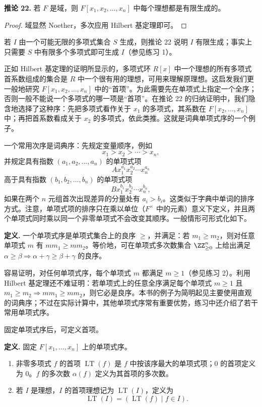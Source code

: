 \noindent\textbf{推论 22.} 若 $F$ 是域，则 $F[x_1,x_2,\ldots,x_n]$ 中每个理想都是有限生成的。

\begin{proof}
	域显然 Noether，多次应用 Hilbert 基定理即可。
\end{proof}

若 $I$ 由一个可能无限的多项式集合 $S$ 生成，则推论 22 说明 $I$ 有限生成；事实上只需要 $S$ 中有限多个多项式即可生成 $I$（参见练习 1）。

正如 Hilbert 基定理的证明所显示的，多项式环 $R[x]$ 中一个理想的所有多项式首系数组成的集合是 $R$ 中一个很有用的理想，可用来理解原理想。这启发我们更一般地研究 $F[x_1,x_2,\ldots,x_n]$ 中的“首项”。为此需要先在单项式上指定一个全序；否则一般不能说一个多项式的哪一项是“首项”。在推论 22 的归纳证明中，我们隐含地选择了这种序：先把多项式看作关于 $x_1$ 的多项式，其系数在 $F[x_2,\ldots,x_n]$ 中；再把首系数看成关于 $x_2$ 的多项式，依此类推。这就是词典单项式序的一个例子。

一个常用次序是词典序：先规定变量顺序，例如
\[
x_1>x_2>\cdots>x_n,
\]
并规定具有指数 $(a_1,a_2,\ldots,a_n)$ 的单项式项
\[
A x_1^{a_1}x_2^{a_2}\cdots x_n^{a_n}
\]
高于具有指数 $(b_1,b_2,\ldots,b_n)$ 的单项式项
\[
B x_1^{b_1}x_2^{b_2}\cdots x_n^{b_n},
\]
如果在两个 $n$ 元组首次出现差异的分量处有 $a_i>b_i$。这类似于字典中单词的排序方式。注意，单项式项的排序只在乘以单位（$F^\times$ 中的元素）意义下定义，并且两个单项式同时乘以同一个非零单项式不会改变其顺序。一般情形可形式化如下。

\noindent\textbf{定义.} 一个单项式序是单项式集合上的良序 $\geq$，并满足：若 $m_1\geq m_2$，则对任意单项式 $m$ 有 $mm_1\geq mm_2$。等价地，可在单项式多次数集合 $\ZZ_{\geq0}^n$ 上给出满足 $\alpha\geq\beta\Rightarrow \alpha+\gamma\geq\beta+\gamma$ 的良序。

容易证明，对任何单项式序，每个单项式 $m$ 都满足 $m\geq1$（参见练习 2）。利用 Hilbert 基定理还不难证明：若单项式上的任意全序满足每个单项式 $m\geq1$ 且 $m_1\geq m_2\Rightarrow mm_1\geq mm_2$，则它必是良序。本书的例子为简明起见主要使用直观的词典序；不过在实际计算中，其他单项式序常有重要优势，练习中还介绍了若干常用单项式序。

固定单项式序后，可定义首项。

\noindent\textbf{定义.} 固定 $F[x_1,\ldots,x_n]$ 上的单项式序。
\begin{enumerate}[label=(\arabic*)]
	\item 非零多项式 $f$ 的首项 $\operatorname{LT}(f)$ 是 $f$ 中按该序最大的单项式项；$0$ 的首项定义为 $0$。$f$ 的多次数 $\alpha(f)$ 定义为其首项的多次数。
	\item 若 $I$ 是理想，$I$ 的首项理想记为 $\operatorname{LT}(I)$，定义为
	\[
	\operatorname{LT}(I)=(\operatorname{LT}(f)\mid f\in I).
	\]
\end{enumerate}

